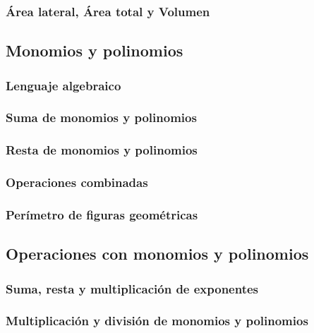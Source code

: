 \documentclass[12pt,addpoints,answers]{evalua}
\begin{document}
\begin{questions}
	\subsubsection{Área lateral, Área total y Volumen}
	\question[1]{}
	\subsection   {Monomios y polinomios}
	\subsubsection{Lenguaje algebraico}
	\question[1]{}
	\subsubsection{Suma de monomios y polinomios}
	\question[1]{}
	\subsubsection{Resta de monomios y polinomios}
	\question[1]{}
	\subsubsection{Operaciones combinadas}
	\question[1]{}
	\subsubsection{Perímetro de figuras geométricas}
	\question[1]{}
	\subsection   {Operaciones con monomios y polinomios}
	\subsubsection{Suma, resta y multiplicación de exponentes}
	\question[1]{}
	\subsubsection{Multiplicación y división de monomios y polinomios}
	\question[1]{}

\end{questions}
\end{document}
